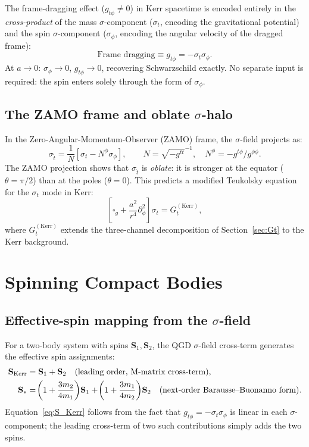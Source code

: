 \documentclass[11pt,a4paper]{article}
\theoremstyle{plain}
\theoremstyle{definition}
\theoremstyle{remark}
\begin{document}
The frame-dragging effect ($g_{t\phi}\ne0$) in Kerr spacetime is encoded entirely
in the \emph{cross-product} of the mass $\sigma$-component ($\sigma_t$, encoding
the gravitational potential) and the spin $\sigma$-component ($\sigma_\phi$,
encoding the angular velocity of the dragged frame):
\begin{equation}
  \text{Frame dragging} \equiv g_{t\phi} = -\sigma_t\sigma_\phi.
\end{equation}
At $a\to0$: $\sigma_\phi\to0$, $g_{t\phi}\to0$, recovering Schwarzschild exactly.
No separate input is required: the spin enters solely through the form of $\sigma_\phi$.

\subsection{The ZAMO frame and oblate $\sigma$-halo}

In the Zero-Angular-Momentum-Observer (ZAMO) frame, the $\sigma$-field projects as:
\begin{equation}
  \sigma_{\hat t} = \frac{1}{N}\!\left[\sigma_t - N^\phi\sigma_\phi\right],
  \qquad N = \sqrt{-g^{tt}}^{-1},\quad N^\phi = -g^{t\phi}/g^{\phi\phi}.
\end{equation}
The ZAMO projection shows that $\sigma_{\hat t}$ is \emph{oblate}: it is stronger
at the equator ($\theta=\pi/2$) than at the poles ($\theta=0$).  This predicts
a modified Teukolsky equation for the $\sigma_t$ mode in Kerr:
\begin{equation}
  \left[\square_g + \frac{a^2}{r^4}\partial_\phi^2\right]\sigma_t
    = G_t^{(\mathrm{Kerr})},
  \label{eq:Teukolsky_QGD}
\end{equation}
where $G_t^{(\mathrm{Kerr})}$ extends the three-channel decomposition of
Section~\ref{sec:Gt} to the Kerr background.

\section{Spinning Compact Bodies}
\label{sec:spin}

\subsection{Effective-spin mapping from the $\sigma$-field}

For a two-body system with spins $\mathbf{S}_1,\mathbf{S}_2$, the QGD
$\sigma$-field cross-term generates the effective spin assignments:
\begin{align}
  \mathbf{S}_{\rm Kerr} &= \mathbf{S}_1 + \mathbf{S}_2
    \quad\text{(leading order, M-matrix cross-term)},
  \label{eq:S_Kerr}\\
  \mathbf{S}_* &= \!\left(1 + \frac{3m_2}{4m_1}\right)\!\mathbf{S}_1
    + \!\left(1 + \frac{3m_1}{4m_2}\right)\!\mathbf{S}_2
    \quad\text{(next-order Barausse--Buonanno form).}
  \label{eq:S_star}
\end{align}
Equation~\eqref{eq:S_Kerr} follows from the fact that $g_{t\phi} = -\sigma_t\sigma_\phi$
is linear in each $\sigma$-component; the leading cross-term of two such contributions
simply adds the two spins.
\end{document}
